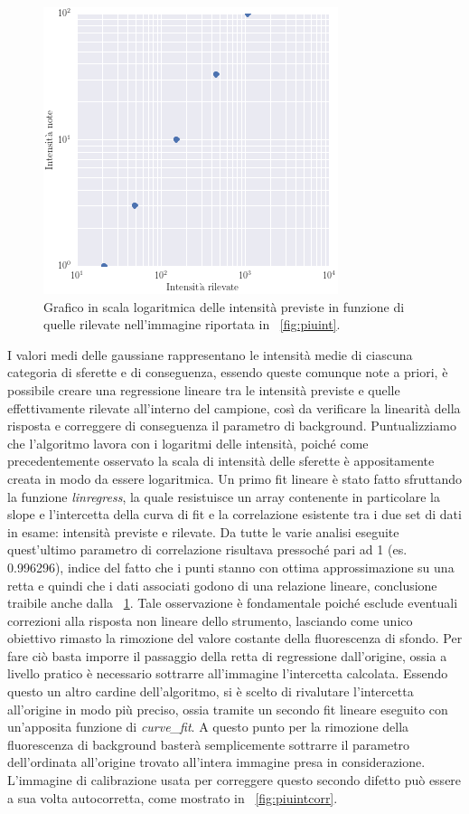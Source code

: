\begin{figure}
 \centering
 \includegraphics[scale=.70]{img/CAP3linearita.png}
 \caption{\small{Grafico in scala logaritmica delle intensità previste in funzione di quelle rilevate nell'immagine riportata in \figurename~\ref{fig:piuint}.}}
 \label{fig:linearita}
\end{figure}

I valori medi delle gaussiane rappresentano le intensità medie di ciascuna categoria di sferette e di conseguenza, essendo queste comunque note a priori, è possibile creare una regressione lineare tra le intensità previste e quelle effettivamente rilevate all'interno del campione, così da verificare la linearità della risposta e correggere di conseguenza il parametro di background. 
Puntualizziamo che l'algoritmo lavora con i logaritmi delle intensità, poiché come precedentemente osservato la scala di intensità delle sferette è appositamente creata in modo da essere logaritmica.
Un primo fit lineare è stato fatto sfruttando la funzione \textit{linregress}, la quale resistuisce un array contenente in particolare la slope e l'intercetta della curva di fit e la correlazione esistente tra i due set di dati in esame: intensità previste e rilevate.
Da tutte le varie analisi eseguite quest'ultimo parametro di correlazione risultava pressoché pari ad 1 (es. 0.996296), indice del fatto che i punti stanno con ottima approssimazione su una retta e quindi che i dati associati godono di una relazione lineare, conclusione traibile anche dalla \figurename~\ref{fig:linearita}.
Tale osservazione è fondamentale poiché esclude eventuali correzioni alla risposta non lineare dello strumento, lasciando come unico obiettivo rimasto la rimozione del valore costante della fluorescenza di sfondo. 
Per fare ciò basta imporre il passaggio della retta di regressione dall'origine, ossia a livello pratico è necessario sottrarre all'immagine l'intercetta calcolata. 
Essendo questo un altro cardine dell'algoritmo, si è scelto di rivalutare l'intercetta all'origine in modo più preciso, ossia tramite un secondo fit lineare eseguito con un'apposita funzione di \textit{curve\_fit}.
A questo punto per la rimozione della fluorescenza di background basterà semplicemente sottrarre il parametro dell'ordinata all'origine trovato all'intera immagine presa in considerazione. 
L'immagine di calibrazione usata per correggere questo secondo difetto può essere a sua volta autocorretta, come mostrato in \figurename~\ref{fig:piuintcorr}.

